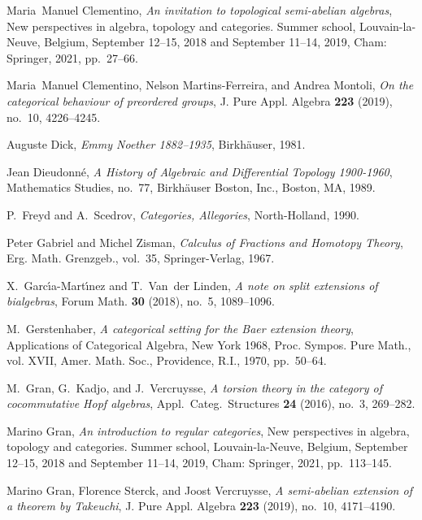 \documentclass [12pt,oneside]{book}%
\theoremstyle{captionstyle}  %
\begin{document}
\begin{thebibliography}{10}
    Maria~Manuel Clementino, \emph{An invitation to topological semi-abelian
        algebras}, New perspectives in algebra, topology and categories. Summer
    school, Louvain-la-Neuve, Belgium, September 12--15, 2018 and September
    11--14, 2019, Cham: Springer, 2021, pp.~27--66.

    Maria~Manuel Clementino, Nelson Martins-Ferreira, and Andrea Montoli, \emph{On
        the categorical behaviour of preordered groups}, J. Pure Appl. Algebra
    \textbf{223} (2019), no.~10, 4226--4245.

    Auguste Dick, \emph{{Emmy Noether 1882–1935}}, Birkh\"auser, 1981.

    Jean Dieudonn\'{e}, \emph{{A History of Algebraic and Differential Topology
                1900-1960}}, Mathematics Studies, no.~77, Birkh\"{a}user Boston, Inc.,
    Boston, MA, 1989.

    P.~Freyd and A.~Scedrov, \emph{Categories, {A}llegories}, North-Holland, 1990.

    Peter Gabriel and Michel Zisman, \emph{{Calculus of Fractions and Homotopy
                Theory}}, Erg. Math. Grenzgeb., vol.~35, Springer-Verlag, 1967.

    X.~Garc{\'\i}a-Mart{\'\i}nez and T.~Van~der Linden, \emph{A note on split
        extensions of bialgebras}, Forum Math. \textbf{30} (2018), no.~5, 1089--1096.

    M.~Gerstenhaber, \emph{A categorical setting for the {B}aer extension theory},
    Applications of Categorical Algebra, New York 1968, Proc. Sympos. Pure Math.,
    vol. XVII, Amer. Math. Soc., Providence, R.I., 1970, pp.~50--64.

    M.~Gran, G.~Kadjo, and J.~Vercruysse, \emph{A torsion theory in the category of
        cocommutative {H}opf algebras}, Appl.\ Categ.\ Structures \textbf{24} (2016),
    no.~3, 269--282.

    Marino Gran, \emph{An introduction to regular categories}, New perspectives in
    algebra, topology and categories. Summer school, Louvain-la-Neuve, Belgium,
    September 12--15, 2018 and September 11--14, 2019, Cham: Springer, 2021,
    pp.~113--145.

    Marino Gran, Florence Sterck, and Joost Vercruysse, \emph{A semi-abelian
        extension of a theorem by {T}akeuchi}, J. Pure Appl. Algebra \textbf{223}
    (2019), no.~10, 4171--4190.


\end{thebibliography}
\end{document}
